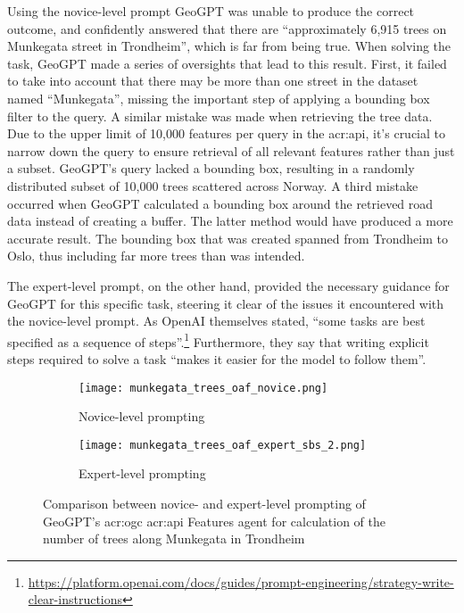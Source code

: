 \FloatBarrier

Using the novice-level prompt GeoGPT was unable to produce the correct outcome, and confidently answered that there are \enquote{approximately 6,915 trees on Munkegata street in Trondheim}, which is far from being true. When solving the task, GeoGPT made a series of oversights that lead to this result. First, it failed to take into account that there may be more than one street in the dataset named \enquote{Munkegata}, missing the important step of applying a bounding box filter to the query. A similar mistake was made when retrieving the tree data. Due to the upper limit of 10,000 features per query in the \acrshort{acr:api}, it's crucial to narrow down the query to ensure retrieval of all relevant features rather than just a subset. GeoGPT's query lacked a bounding box, resulting in a randomly distributed subset of 10,000 trees scattered across Norway. A third mistake occurred when GeoGPT calculated a bounding box around the retrieved road data instead of creating a buffer. The latter method would have produced a more accurate result. The bounding box that was created spanned from Trondheim to Oslo, thus including far more trees than was intended.

The expert-level prompt, on the other hand, provided the necessary guidance for GeoGPT for this specific task, steering it clear of the issues it encountered with the novice-level prompt. As OpenAI themselves stated, \enquote{some tasks are best specified as a sequence of steps}.\footnote{\url{https://platform.openai.com/docs/guides/prompt-engineering/strategy-write-clear-instructions}} Furthermore, they say that writing explicit steps required to solve a task \enquote{makes it easier for the model to follow them}.

\begin{figure}[htbp]
    \centering
    \begin{subfigure}[b]{0.7\textwidth}
        \centering
        \texttt{[image: munkegata\_trees\_oaf\_novice.png]}
        \caption{Novice-level prompting}
        \label{fig:novice-level-prompting-munkegata-trees}
    \end{subfigure}
    \hfill
    \begin{subfigure}[b]{0.7\textwidth}
        \centering
        \texttt{[image: munkegata\_trees\_oaf\_expert\_sbs\_2.png]}
        \caption{Expert-level prompting}
        \label{fig:expert-level-prompting-munkegata-trees}
    \end{subfigure}
    \caption{Comparison between novice- and expert-level prompting of GeoGPT's \acrshort{acr:ogc} \acrshort{acr:api} Features agent for calculation of the number of trees along Munkegata in Trondheim}
    \label{fig:novice-vs-expert-munkegata-trees}
\end{figure}

